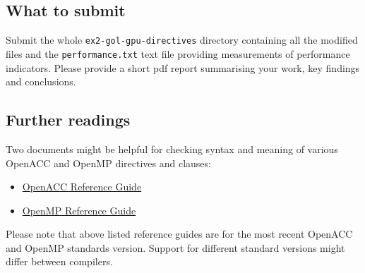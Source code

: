 \documentclass[a4paper, 11pt]{article}
\begin{document}
\subsection{What to submit}
Submit the whole \texttt{ex2-gol-gpu-directives} directory containing all the modified files and the \texttt{performance.txt} text file providing measurements of performance indicators. Please provide a short pdf report summarising your work, key findings and conclusions.

\subsection{Further readings}

Two documents might be helpful for checking syntax and meaning of various OpenACC and OpenMP directives and clauses:
\begin{itemize}
\item \href{https://www.openacc.org/sites/default/files/inline-files/API%20Guide%202.7.pdf}{OpenACC Reference Guide}
\item \href{https://www.openmp.org/wp-content/uploads/OpenMPRef-5.0-111802-web.pdf}{OpenMP Reference Guide}
\end{itemize}
Please note that above listed reference guides are for the most recent OpenACC and OpenMP standards version. Support for different standard versions might differ between compilers.
\end{document}
